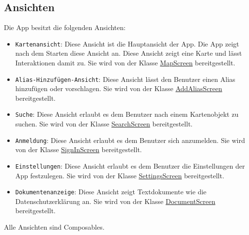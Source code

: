 \subsection{Ansichten}\label{App_Navigation_Screens}
Die App besitzt die folgenden Ansichten:
\begin{itemize}
    \item \texttt{Kartenansicht}: Diese Ansicht ist die Hauptansicht der App. Die App zeigt nach dem Starten diese Ansicht an. 
    Diese Ansicht zeigt eine Karte und lässt Interaktionen damit zu.
    Sie wird von der Klasse \hyperref[App_Map_View_MapScreen]{MapScreen} bereitgestellt.
    \item \texttt{Alias-Hinzufügen-Ansicht}: Diese Ansicht lässt den Benutzer einen Alias hinzufügen oder vorschlagen.
    Sie wird von der Klasse \hyperref[App_AddAlias_AddAliasScreen]{AddAliasScreen} bereitgestellt.
    \item \texttt{Suche}: Diese Ansicht erlaubt es dem Benutzer nach einem Kartenobjekt zu suchen.
    Sie wird von der Klasse \hyperref[App_Search_SearchScreen]{SearchScreen} bereitgestellt.
    \item \texttt{Anmeldung}: Diese Ansicht erlaubt es dem Benutzer sich anzumelden.
    Sie wird von der Klasse \hyperref[App_Signup_SignInScreen]{SignInScreen} bereitgestellt.
    \item \texttt{Einstellungen}: Diese Ansicht erlaubt es dem Benutzer die Einstellungen der App festzulegen.
    Sie wird von der Klasse \hyperref[App_Settings_SettingsScreen]{SettingsScreen} bereitgestellt.
    \item \texttt{Dokumentenanzeige}: Diese Ansicht zeigt Textdokumente wie die Datenschutzerklärung an.
    Sie wird von der Klasse \hyperref[App_DocumentViewer_DocumentScreen]{DocumentScreen} bereitgestellt.
\end{itemize}
Alle Ansichten sind Composables.